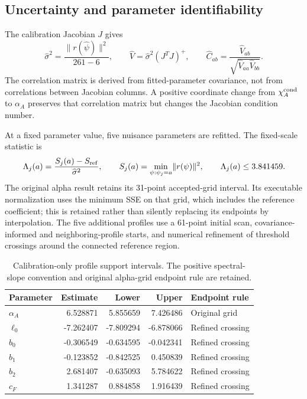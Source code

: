 \documentclass[11pt,a4paper]{article}
\begin{document}
\subsection{Uncertainty and parameter identifiability}

The calibration Jacobian $J$ gives
\begin{equation}
 \widehat\sigma^2=\frac{\lVert r(\widehat\psi)\rVert^2}{261-6},\qquad
 \widehat V=\widehat\sigma^2(J^TJ)^+,\qquad
 \widehat C_{ab}=\frac{\widehat V_{ab}}{\sqrt{\widehat V_{aa}\widehat V_{bb}}}.
\end{equation}
The correlation matrix is derived from fitted-parameter covariance, not from correlations between Jacobian columns. A positive coordinate change from $\chi_A^{\rm cond}$ to $\alpha_A$ preserves that correlation matrix but changes the Jacobian condition number.

At a fixed parameter value, five nuisance parameters are refitted. The fixed-scale statistic is
\begin{equation}
 \Lambda_j(a)=\frac{S_j(a)-S_{\rm ref}}{\widehat\sigma^2},\qquad
 S_j(a)=\min_{\psi:\psi_j=a}\lVert r(\psi)\rVert^2,
 \qquad \Lambda_j(a)\leq3.841459.
\end{equation}
The original alpha result retains its 31-point accepted-grid interval. Its executable normalization uses the minimum SSE on that grid, which includes the reference coefficient; this is retained rather than silently replacing its endpoints by interpolation. The five additional profiles use a 61-point initial scan, covariance-informed and neighboring-profile starts, and numerical refinement of threshold crossings around the connected reference region.

\begin{table}[htbp]\centering\small
\caption{Calibration-only profile support intervals. The positive spectral-slope convention and original alpha-grid endpoint rule are retained.}
\label{tab:profiles}
\begin{tabular}{lrrrl}
\toprule
Parameter & Estimate & Lower & Upper & Endpoint rule \\
\midrule
$\alpha_A$ & 6.528871 & 5.855659 & 7.426486 & Original grid \\
$\ell_0$ & -7.262407 & -7.809294 & -6.878066 & Refined crossing \\
$b_0$ & -0.306549 & -0.634595 & -0.042341 & Refined crossing \\
$b_1$ & -0.123852 & -0.842525 & 0.450839 & Refined crossing \\
$b_2$ & 2.681407 & -0.635093 & 5.784622 & Refined crossing \\
$c_F$ & 1.341287 & 0.884858 & 1.916439 & Refined crossing \\
\bottomrule
\end{tabular}
\end{table}
\end{document}
